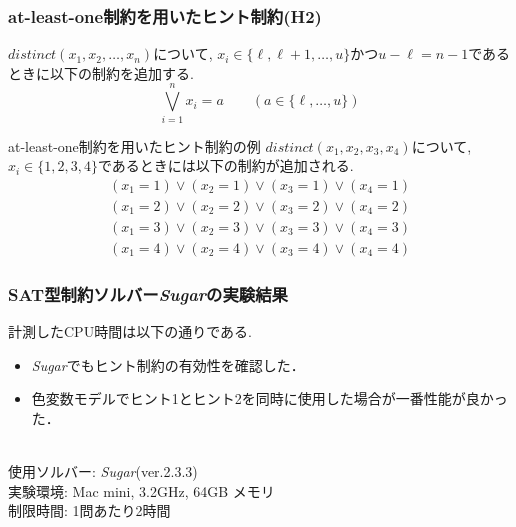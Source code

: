 %
%
\begin{frame}
    \frametitle{at-least-one制約を用いたヒント制約(H2)}
    \vspace{-3mm}
    \begin{block}{}
        $distinct(x_1,x_2,\ldots,x_n)$について, $x_i \in \{\ell, \ell+1,\ldots, u\}$かつ$u-\ell=n-1$であるときに以下の制約を追加する.\\
        \vspace{-3mm}
        $$\bigvee_{i=1}^n x_i=a \qquad (a \in \{\ell,\ldots, u\})$$
    \end{block}
    \begin{exampleblock}{at-least-one制約を用いたヒント制約の例}
        $distinct(x_1, x_2, x_3, x_4)$について, $x_i \in \{1, 2, 3, 4\}$であるときには以下の制約が追加される.
        \vspace{-3mm}
        \begin{eqnarray*}
            (x_1=1) \lor (x_2=1) \lor (x_3=1) \lor (x_4=1)\\
            (x_1=2) \lor (x_2=2) \lor (x_3=2) \lor (x_4=2)\\
            (x_1=3) \lor (x_2=3) \lor (x_3=3) \lor (x_4=3)\\
            (x_1=4) \lor (x_2=4) \lor (x_3=4) \lor (x_4=4)
        \end{eqnarray*}

    \end{exampleblock}
\end{frame}


\begin{frame}
\frametitle{SAT型制約ソルバー\textit{Sugar}の実験結果}
計測したCPU時間は以下の通りである.
\begin{block}{}
    {\tiny  }
\end{block}
\begin{itemize}
\item \textit{Sugar}でもヒント制約の有効性を確認した．
\item 色変数モデルでヒント1とヒント2を同時に使用した場合が一番性能が良かった．
\end{itemize}
\\
{\footnotesize
使用ソルバー: \textit{Sugar}(ver.2.3.3)\\
実験環境: Mac mini, 3.2GHz, 64GB メモリ\\
制限時間: 1問あたり2時間\\
}
\end{frame}

